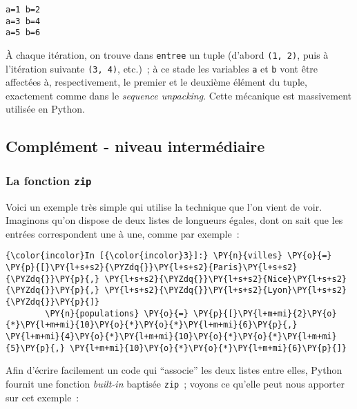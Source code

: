     \begin{Verbatim}[commandchars=\\\{\}]
a=1 b=2
a=3 b=4
a=5 b=6

    \end{Verbatim}

    À chaque itération, on trouve dans \texttt{entree} un tuple (d'abord
\texttt{(1,\ 2)}, puis à l'itération suivante \texttt{(3,\ 4)}, etc.)~;
à ce stade les variables \texttt{a} et \texttt{b} vont être affectées à,
respectivement, le premier et le deuxième élément du tuple, exactement
comme dans le \emph{sequence unpacking}. Cette mécanique est massivement
utilisée en Python.

    \hypertarget{compluxe9ment---niveau-intermuxe9diaire}{%
\subsection{Complément - niveau
intermédiaire}\label{compluxe9ment---niveau-intermuxe9diaire}}

    \hypertarget{la-fonction-zip}{%
\subsubsection{\texorpdfstring{La fonction
\texttt{zip}}{La fonction zip}}\label{la-fonction-zip}}

    Voici un exemple très simple qui utilise la technique que l'on vient de
voir.\\

    Imaginons qu'on dispose de deux listes de longueurs égales, dont on sait
que les entrées correspondent une à une, comme par exemple~:

    \begin{Verbatim}[commandchars=\\\{\}]
{\color{incolor}In [{\color{incolor}3}]:} \PY{n}{villes} \PY{o}{=} \PY{p}{[}\PY{l+s+s2}{\PYZdq{}}\PY{l+s+s2}{Paris}\PY{l+s+s2}{\PYZdq{}}\PY{p}{,} \PY{l+s+s2}{\PYZdq{}}\PY{l+s+s2}{Nice}\PY{l+s+s2}{\PYZdq{}}\PY{p}{,} \PY{l+s+s2}{\PYZdq{}}\PY{l+s+s2}{Lyon}\PY{l+s+s2}{\PYZdq{}}\PY{p}{]}
        \PY{n}{populations} \PY{o}{=} \PY{p}{[}\PY{l+m+mi}{2}\PY{o}{*}\PY{l+m+mi}{10}\PY{o}{*}\PY{o}{*}\PY{l+m+mi}{6}\PY{p}{,} \PY{l+m+mi}{4}\PY{o}{*}\PY{l+m+mi}{10}\PY{o}{*}\PY{o}{*}\PY{l+m+mi}{5}\PY{p}{,} \PY{l+m+mi}{10}\PY{o}{*}\PY{o}{*}\PY{l+m+mi}{6}\PY{p}{]}
\end{Verbatim}


    Afin d'écrire facilement un code qui ``associe'' les deux listes entre
elles, Python fournit une fonction \emph{built-in} baptisée
\texttt{zip}~; voyons ce qu'elle peut nous apporter sur cet exemple~:

